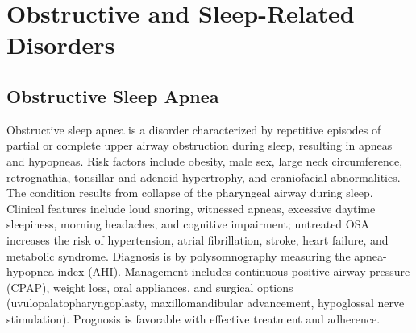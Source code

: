 \section{Obstructive and Sleep-Related Disorders}








\label{sec:Obstructive and Sleep-Related Disorders}

\subsection{Obstructive Sleep Apnea}
\label{sec:throat:Obstructive Sleep Apnea}
Obstructive sleep apnea is a disorder characterized by repetitive episodes of partial or complete upper airway obstruction during sleep, resulting in apneas and hypopneas. Risk factors include obesity, male sex, large neck circumference, retrognathia, tonsillar and adenoid hypertrophy, and craniofacial abnormalities. The condition results from collapse of the pharyngeal airway during sleep. Clinical features include loud snoring, witnessed apneas, excessive daytime sleepiness, morning headaches, and cognitive impairment; untreated OSA increases the risk of hypertension, atrial fibrillation, stroke, heart failure, and metabolic syndrome. Diagnosis is by polysomnography measuring the apnea-hypopnea index (AHI). Management includes continuous positive airway pressure (CPAP), weight loss, oral appliances, and surgical options (uvulopalatopharyngoplasty, maxillomandibular advancement, hypoglossal nerve stimulation). Prognosis is favorable with effective treatment and adherence.

